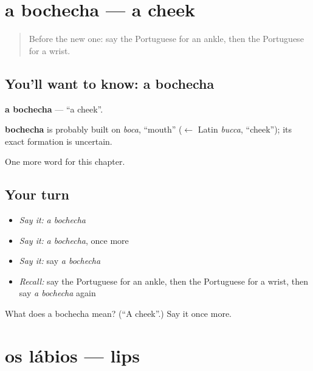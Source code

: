 \section[a bochecha]{a bochecha — a cheek}

\label{lesson:PT-C120-bochecha}



\begin{quote}
Before the new one: say the Portuguese for an ankle, then the Portuguese for a wrist.
\end{quote}

\subsection*{You'll want to know: a bochecha}
\textbf{a bochecha} — \textquotedblleft{}a cheek\textquotedblright{}.

\begin{cousinweb}
\textbf{bochecha} is probably built on \emph{boca}, \textquotedblleft{}mouth\textquotedblright{} ($\leftarrow$ Latin \emph{bucca}, \textquotedblleft{}cheek\textquotedblright{}); its exact formation is uncertain.
\end{cousinweb}

\begin{grammarlens}[title={What you've built}]
One more word for this chapter.
\end{grammarlens}

\subsection*{Your turn}
\begin{itemize}
\raggedright
  \item \emph{Say it:} \emph{a bochecha}
  \item \emph{Say it:} \emph{a bochecha}, once more
  \item \emph{Say it:} say \emph{a bochecha}
  \item \emph{Recall:} say the Portuguese for an ankle, then the Portuguese for a wrist, then say \emph{a bochecha} again
\end{itemize}

\begin{tcolorbox}[breakable,colback=teal!4,colframe=teal!35!black,title={Before you move on}]
What does a bochecha mean? (\textquotedblleft{}A cheek\textquotedblright{}.) Say it once more.
\end{tcolorbox}
\section[os lábios]{os lábios — lips}

